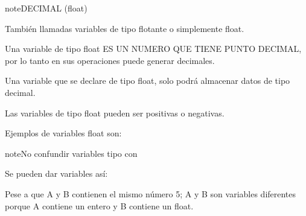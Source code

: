 \documentclass[letterpaper,10pt,spanish]{sphinxmanual}
\begin{document}
\begin{sphinxadmonition}{note}{DECIMAL (float)}

\sphinxAtStartPar
También llamadas variables de tipo flotante o simplemente float.

\sphinxAtStartPar
Una variable de tipo float ES UN NUMERO QUE TIENE PUNTO DECIMAL, por lo tanto en sus operaciones puede generar decimales.

\sphinxAtStartPar
Una variable que se declare de tipo float, solo podrá almacenar datos de tipo decimal.

\sphinxAtStartPar
Las variables de tipo float pueden ser positivas o negativas.

\sphinxAtStartPar
Ejemplos de variables float son:

\begin{sphinxVerbatim}[commandchars=\\\{\},numbers=left,firstnumber=1,stepnumber=1]
  
  
  
  
  
  
  
\end{sphinxVerbatim}

\begin{sphinxadmonition}{note}{No confundir variables tipo  con }

\sphinxAtStartPar
Se pueden dar variables así:

\begin{sphinxVerbatim}[commandchars=\\\{\},numbers=left,firstnumber=1,stepnumber=1]
  
  
\end{sphinxVerbatim}

\sphinxAtStartPar
Pese a que A y B contienen el mismo número 5; A y B son variables diferentes porque A contiene un entero y B contiene un float.
\end{sphinxadmonition}
\end{sphinxadmonition}
\end{document}
